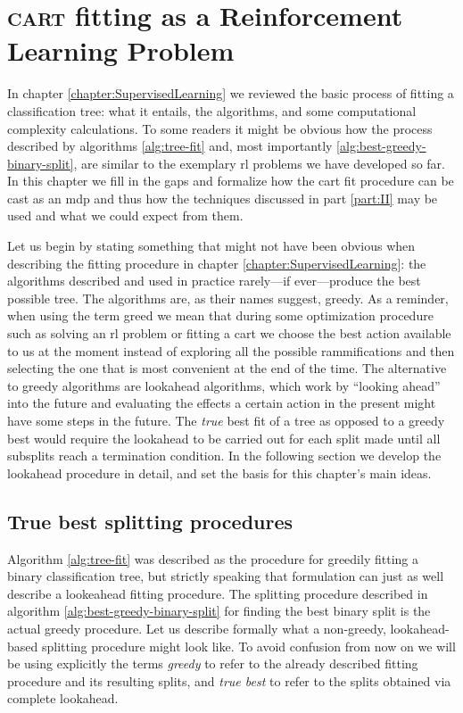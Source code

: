 \chapter{\textsc{cart} fitting as a Reinforcement Learning Problem}
\label{chapter:CARTasRLP}

In chapter \ref{chapter:SupervisedLearning} we reviewed the basic process of
fitting a classification tree: what it entails, the algorithms, and some
computational complexity calculations. To some readers it might be obvious how
the process described by algorithms \ref{alg:tree-fit} and, most importantly
\ref{alg:best-greedy-binary-split}, are similar to the exemplary \ac{rl}
problems we have developed so far. In this chapter we fill in the gaps and
formalize how the \ac{cart} fit procedure can be cast as an \ac{mdp} and thus how the
techniques discussed in part \ref{part:II} may be used and what we could expect
from them.

Let us begin by stating something that might not have been obvious when
describing the fitting procedure in chapter \ref{chapter:SupervisedLearning}:
the algorithms described and used in practice rarely---if ever---produce the
best possible tree. The algorithms are, as their names suggest, greedy. As a
reminder, when using the term greed we mean that during some optimization
procedure such as solving an \ac{rl} problem or fitting a \ac{cart} we choose
the best action available to us at the moment instead of exploring all the
possible rammifications and then selecting the one that is most convenient at
the end of the time. The alternative to greedy algorithms are lookahead
algorithms, which work by ``looking ahead'' into the future and evaluating the
effects a certain action in the present might have some steps in the future. The
\emph{true} best fit of a tree as opposed to a greedy best would require the
lookahead to be carried out for each split made until all subsplits reach a
termination condition. In the following section we develop the lookahead
procedure in detail, and set the basis for this chapter's main ideas.

\section{True best splitting procedures}

Algorithm \ref{alg:tree-fit} was described as the procedure for greedily fitting
a binary classification tree, but strictly speaking that formulation can just as
well describe a lookeahead fitting procedure. The splitting procedure described
in algorithm \ref{alg:best-greedy-binary-split} for finding the best binary
split is the actual greedy procedure. Let us describe formally what a
non-greedy, lookahead-based splitting procedure might look like. To avoid
confusion from now on we will be using explicitly the terms \emph{greedy} to
refer to the already described fitting procedure and its resulting splits, and
\emph{true best} to refer to the splits obtained via complete lookahead. 

